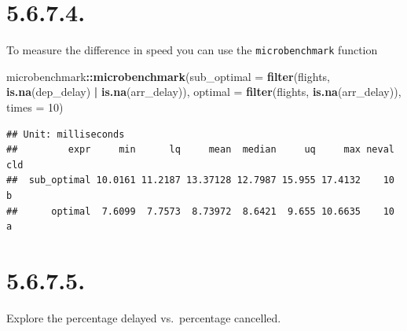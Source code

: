 \documentclass[]{book}
\newenvironment{Shaded}{\begin{snugshade}}{\end{snugshade}}
\newcommand{\DataTypeTok}[1]{\textcolor[rgb]{0.13,0.29,0.53}{#1}}
\newcommand{\DecValTok}[1]{\textcolor[rgb]{0.00,0.00,0.81}{#1}}
\newcommand{\KeywordTok}[1]{\textcolor[rgb]{0.13,0.29,0.53}{\textbf{#1}}}
\newcommand{\NormalTok}[1]{#1}
\newcommand{\OperatorTok}[1]{\textcolor[rgb]{0.81,0.36,0.00}{\textbf{#1}}}
\newcommand{\StringTok}[1]{\textcolor[rgb]{0.31,0.60,0.02}{#1}}
\theoremstyle{definition}
\theoremstyle{definition}
\theoremstyle{definition}
\theoremstyle{remark}
\begin{document}
\hypertarget{section-15}{%
\section{5.6.7.4.}\label{section-15}}

To measure the difference in speed you can use the
\texttt{microbenchmark} function

\begin{Shaded}
\begin{Highlighting}[]
\NormalTok{microbenchmark}\OperatorTok{::}\KeywordTok{microbenchmark}\NormalTok{(}\DataTypeTok{sub_optimal =} \KeywordTok{filter}\NormalTok{(flights, }\KeywordTok{is.na}\NormalTok{(dep_delay) }\OperatorTok{|}\StringTok{ }\KeywordTok{is.na}\NormalTok{(arr_delay)),}
                               \DataTypeTok{optimal =} \KeywordTok{filter}\NormalTok{(flights, }\KeywordTok{is.na}\NormalTok{(arr_delay)),}
                               \DataTypeTok{times =} \DecValTok{10}\NormalTok{)}
\end{Highlighting}
\end{Shaded}

\begin{verbatim}
## Unit: milliseconds
##         expr     min      lq     mean  median     uq     max neval cld
##  sub_optimal 10.0161 11.2187 13.37128 12.7987 15.955 17.4132    10   b
##      optimal  7.6099  7.7573  8.73972  8.6421  9.655 10.6635    10  a
\end{verbatim}

\hypertarget{section-16}{%
\section{5.6.7.5.}\label{section-16}}

Explore the percentage delayed vs.~percentage cancelled.
\end{document}
